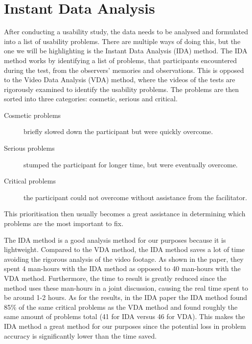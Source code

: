 \section{Instant Data Analysis}
\label{section:IDA}
After conducting a usability study, the data needs to be analysed and formulated into a list of usability problems.
There are multiple ways of doing this, but the one we will be highlighting is the Instant Data Analysis (IDA)\cite{IDA} method.
The IDA method works by identifying a list of problems, that participants encountered during the test, from the observers' memories and observations.
This is opposed to the Video Data Analysis (VDA) method, where the videos of the tests are rigorously examined to identify the usability problems.
The problems are then sorted into three categories: cosmetic, serious and critical.
\begin{description}
\item[Cosmetic problems] briefly slowed down the participant but were quickly overcome.
\item[Serious problems] stumped the participant for longer time, but were eventually overcome.
\item[Critical problems] the participant could not overcome without assistance from the facilitator.
\end{description}
This prioritisation then usually becomes a great assistance in determining which problems are the most important to fix.

The IDA method is a good analysis method for our purposes because it is lightweight.
Compared to the VDA method, the IDA method saves a lot of time avoiding the rigorous analysis of the video footage.
As shown in the paper\cite{IDA}, they spent 4 man-hours with the IDA method as opposed to 40 man-hours with the VDA method.
Furthermore, the time to result is greatly reduced since the method uses these man-hours in a joint discussion, causing the real time spent to be around 1-2 hours.
As for the results, in the IDA paper\cite{IDA} the IDA method found 85\% of the same critical problems as the VDA method and found roughly the same amount of problems total (41 for IDA versus 46 for VDA).
This makes the IDA method a great method for our purposes since the potential loss in problem accuracy is significantly lower than the time saved.